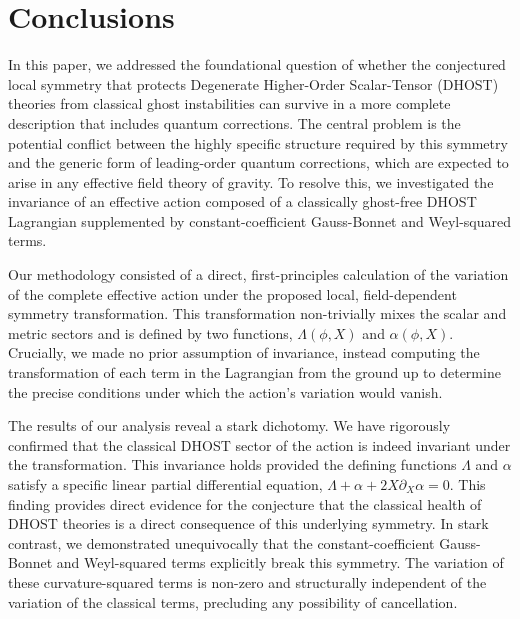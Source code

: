 \documentclass[twocolumn]{aastex631}
\begin{document}
\section{Conclusions}
\label{sec:conclusions}
In this paper, we addressed the foundational question of whether the conjectured local symmetry that protects Degenerate Higher-Order Scalar-Tensor (DHOST) theories from classical ghost instabilities can survive in a more complete description that includes quantum corrections. The central problem is the potential conflict between the highly specific structure required by this symmetry and the generic form of leading-order quantum corrections, which are expected to arise in any effective field theory of gravity. To resolve this, we investigated the invariance of an effective action composed of a classically ghost-free DHOST Lagrangian supplemented by constant-coefficient Gauss-Bonnet and Weyl-squared terms.

Our methodology consisted of a direct, first-principles calculation of the variation of the complete effective action under the proposed local, field-dependent symmetry transformation. This transformation non-trivially mixes the scalar and metric sectors and is defined by two functions, $\Lambda(\phi, X)$ and $\alpha(\phi, X)$. Crucially, we made no prior assumption of invariance, instead computing the transformation of each term in the Lagrangian from the ground up to determine the precise conditions under which the action's variation would vanish.

The results of our analysis reveal a stark dichotomy. We have rigorously confirmed that the classical DHOST sector of the action is indeed invariant under the transformation. This invariance holds provided the defining functions $\Lambda$ and $\alpha$ satisfy a specific linear partial differential equation, $\Lambda + \alpha + 2X \partial_X \alpha = 0$. This finding provides direct evidence for the conjecture that the classical health of DHOST theories is a direct consequence of this underlying symmetry. In stark contrast, we demonstrated unequivocally that the constant-coefficient Gauss-Bonnet and Weyl-squared terms explicitly break this symmetry. The variation of these curvature-squared terms is non-zero and structurally independent of the variation of the classical terms, precluding any possibility of cancellation.
\end{document}
